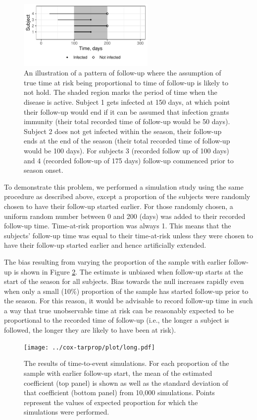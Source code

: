 \begin{figure}[htp]
	\centering
	\includegraphics[width=0.59\textwidth]{../curve-cox/timeplot_4_light.pdf}
	\caption{
		An illustration of a pattern of follow-up where the assumption of true time at risk being proportional to time of follow-up is likely to not hold. The shaded region marks the period of time when the disease is active. Subject 1 gets infected at 150 days, at which point their follow-up would end if it can be assumed that infection grants immunity (their total recorded time of follow-up would be 50 days). Subject 2 does not get infected within the season, their follow-up ends at the end of the season (their total recorded time of follow-up would be 100 days). For subjects 3 (recorded follow up of 100 days) and 4 (recorded follow-up of 175 days) follow-up commenced prior to season onset.
	}
	\label{CoxNotIdeal}
\end{figure}

To demonstrate this problem, we performed a simulation study using the same procedure as described above, except a proportion of the subjects were randomly chosen to have their follow-up started earlier. For those randomly chosen, a uniform random number between 0 and 200 (days) was added to their recorded follow-up time. Time-at-risk proportion was always 1. This means that the subjects' follow-up time was equal to their time-at-risk unless they were chosen to have their follow-up started earlier and hence artificially extended.

The bias resulting from varying the proportion of the sample with earlier follow-up is shown in Figure \ref{CoxSimLong}. The estimate is unbiased when follow-up starts at the start of the season for all subjects. Bias towards the null increases rapidly even when only a small (10\%) proportion of the sample has started follow-up prior to the season. For this reason, it would be advisable to record follow-up time in such a way that true unobservable time at risk can be reasonably expected to be proportional to the recorded time of follow-up (i.e., the longer a subject is followed, the longer they are likely to have been at risk).

\begin{figure}[htp]
	\centering
	\texttt{[image: ../cox-tarprop/plot/long.pdf]}
	\caption{
		The results of time-to-event simulations. For each proportion of the sample with earlier follow-up start, the mean of the estimated coefficient (top panel) is shown as well as the standard deviation of that coefficient (bottom panel) from 10,000 simulations. Points represent the values of expected proportion for which the simulations were performed.
	}
	\label{CoxSimLong}
\end{figure}
